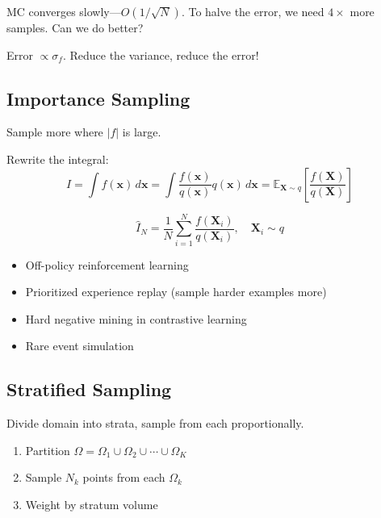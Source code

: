  MC converges slowly---$O(1/\sqrt{N})$. To halve the error, we need $4\times$ more samples. Can we do better?

 Error $\propto \sigma_f$. Reduce the variance, reduce the error!


\subsection{Importance Sampling}

 Sample more where $|f|$ is large.

Rewrite the integral:
\begin{equation}
    I = \int f(\mathbf{x}) \, d\mathbf{x} = \int \frac{f(\mathbf{x})}{q(\mathbf{x})} q(\mathbf{x}) \, d\mathbf{x} = \mathbb{E}_{\mathbf{X} \sim q}\left[\frac{f(\mathbf{X})}{q(\mathbf{X})}\right]
\end{equation}

\begin{equation}
    \hat{I}_N = \frac{1}{N} \sum_{i=1}^{N} \frac{f(\mathbf{X}_i)}{q(\mathbf{X}_i)}, \quad \mathbf{X}_i \sim q
\end{equation}


\begin{itemize}
    \item Off-policy reinforcement learning
    \item Prioritized experience replay (sample harder examples more)
    \item Hard negative mining in contrastive learning
    \item Rare event simulation
\end{itemize}


\subsection{Stratified Sampling}

 Divide domain into strata, sample from each proportionally.

\begin{enumerate}
    \item Partition $\Omega = \Omega_1 \cup \Omega_2 \cup \cdots \cup \Omega_K$
    \item Sample $N_k$ points from each $\Omega_k$
    \item Weight by stratum volume
\end{enumerate}

